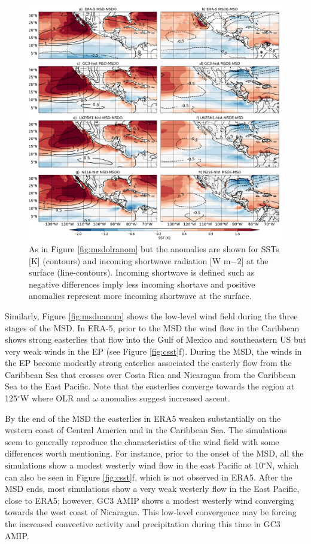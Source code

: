  \begin{figure}[t!]
\includegraphics[width=\linewidth]{figures/fig4_sstv_3}
\caption{As in Figure \ref{fig:msdolranom} but the anomalies are shown for SSTs [K] (contours) and incoming shortwave radiation [W m${-2}$] at the surface (line-contours). Incoming shortwave is defined such as negative differences imply less incoming shortave and positive anomalies represent more incoming shortwave at the surface. }
\label{fig:msdsstanom}
\end{figure}

Similarly, Figure \ref{fig:msduanom} shows the low-level wind field during the three stages of the MSD. In ERA-5, prior to the MSD the wind flow in the Caribbean shows strong easterlies that flow into the Gulf of Mexico and southeastern US but very weak winds in the EP (see Figure \ref{fig:csst}f). During the MSD, the winds in the EP become modestly strong eaterlies associated the easterly flow from the Caribbean Sea that crosses over Costa Rica and Nicaragua from the Caribbean Sea to the East Pacific. Note that the easterlies converge towards the region at 125$^\circ$W where OLR and $\omega$ anomalies suggest increased ascent. 

By the end of the MSD the easterlies in ERA5 weaken substantially on the western coast of Central America and in the Caribbean Sea.
The simulations seem to generally reproduce the characteristics of the wind field with some differences worth mentioning. For instance, prior to the onset of the MSD, all the simulations show a modest westerly wind flow in the east Pacific at 10$^\circ$N, which can also be seen in Figure \ref{fig:csst}f, which is not observed in ERA5.
After the MSD ends, most simulations show a very weak westerly flow in the East Pacific, close to ERA5; however, GC3 AMIP shows a modest westerly wind converging towards the west coast of Nicaragua. This low-level convergence may be forcing the increased convective activity and precipitation during this time in GC3 AMIP.

